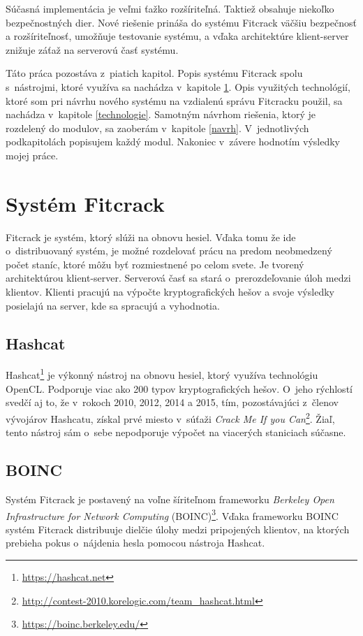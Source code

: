 \documentclass[slovak]{fitthesis}
\begin{document}
Súčasná implementácia je veľmi ťažko rozšíriteľná. Taktiež obsahuje niekoľko bezpečnostných dier. Nové riešenie prináša do systému Fitcrack väčšiu bezpečnosť a rozšíriteľnosť, umožňuje testovanie systému, a vďaka architektúre klient-server znižuje záťaž na serverovú časť systému.

Táto práca pozostáva z~piatich kapitol. Popis systému Fitcrack spolu s~nástrojmi, ktoré využíva sa nachádza v~kapitole \ref{Fitcrack}. Opis využitých technológií, ktoré som pri návrhu nového systému na vzdialenú správu Fitcracku použil, sa nachádza v~kapitole \ref{technologie}. Samotným návrhom riešenia, ktorý je rozdelený do modulov, sa zaoberám v~kapitole \ref{navrh}. V~jednotlivých podkapitolách popisujem každý modul. Nakoniec v~závere hodnotím výsledky mojej práce. 



\chapter{Systém Fitcrack}\label{Fitcrack}
Fitcrack je systém, ktorý slúži na obnovu hesiel. Vďaka tomu že ide o~distribuovaný systém, je možné rozdelovať prácu na predom neobmedzený počet staníc, ktoré môžu byť rozmiestnené po celom svete. Je tvorený  architektúrou klient-server. Serverová časť sa stará o~prerozdeľovanie úloh medzi klientov. Klienti pracujú na výpočte kryptografických hešov a svoje výsledky posielajú na server, kde sa spracujú a vyhodnotia.
\cite{fitcrackSprava}


\section{Hashcat}\label{hashcat}
Hashcat\footnote{\url{https://hashcat.net}} je výkonný nástroj na obnovu hesiel, ktorý využíva technológiu OpenCL. Podporuje viac ako 200 typov kryptografických hešov. O~jeho rýchlostí svedčí aj to, že v~rokoch 2010, 2012, 2014 a 2015, tím, pozostávajúci z~členov vývojárov Hashcatu, získal prvé miesto v~súťaži \textit{Crack Me If you Can}\footnote{\url{http://contest-2010.korelogic.com/team_hashcat.html}}. Žiaľ, tento nástroj sám o~sebe nepodporuje výpočet na viacerých staniciach súčasne.


\section{BOINC} \label{BOINC}
Systém Fitcrack je postavený na voľne šíriteľnom frameworku \textit{Berkeley Open Infrastructure for Network Computing} (BOINC)\footnote{\url{https://boinc.berkeley.edu/}}. Vďaka frameworku BOINC systém Fitcrack distribuuje dielčie úlohy medzi pripojených klientov, na ktorých prebieha pokus o~nájdenia hesla pomocou nástroja Hashcat.
\end{document}
